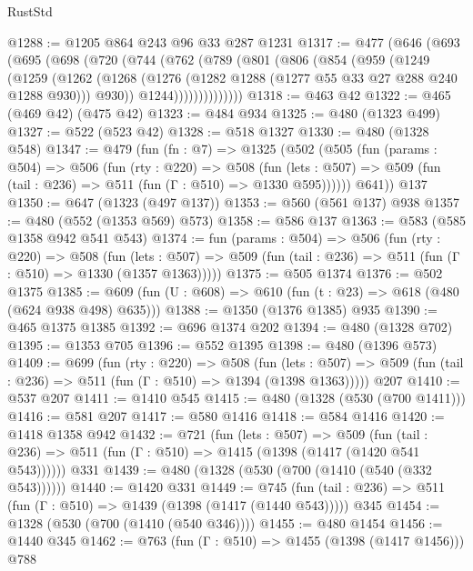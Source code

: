 \begin{lexlean}{RustStd}
\begin{coremodule}
{\begin{coremodule}
{{{{{{{{{@1288 := @1205 @864 @243 @96 @33 @287 @1231
@1317 := @477
    (@646
      (@693
        (@695
          (@698
            (@720
              (@744
                (@762
                  (@789
                    (@801
                      (@806
                        (@854
                          (@959
                            (@1249
                              (@1259
                                (@1262
                                  (@1268
                                    (@1276 (@1282 @1288 (@1277 @55 @33 @27 @288 @240 @1288 @930)))
                                    @930))
                                @1244))))))))))))))
@1318 := @463 @42
@1322 := @465 (@469 @42) (@475 @42)
@1323 := @484 @934
@1325 := @480 (@1323 @499)
@1327 := @522 (@523 @42)
@1328 := @518 @1327
@1330 := @480 (@1328 @548)
@1347 := @479
    (fun (fn : @7) =>
    @1325
      (@502
        (@505
          (fun (params : @504) =>
          @506
            (fun (rty : @220) =>
            @508
              (fun (lets : @507) =>
              @509 (fun (tail : @236) => @511 (fun (Γ : @510) => @1330 @595))))))
        @641))
    @137
@1350 := @647 (@1323 (@497 @137))
@1353 := @560 (@561 @137) @938
@1357 := @480 (@552 (@1353 @569) @573)
@1358 := @586 @137
@1363 := @583 (@585 @1358 @942 @541 @543)
@1374 := fun (params : @504) =>
  @506
    (fun (rty : @220) =>
    @508
      (fun (lets : @507) =>
      @509 (fun (tail : @236) => @511 (fun (Γ : @510) => @1330 (@1357 @1363)))))
@1375 := @505 @1374
@1376 := @502 @1375
@1385 := @609 (fun (U : @608) => @610 (fun (t : @23) => @618 (@480 (@624 @938 @498) @635)))
@1388 := @1350 (@1376 @1385) @935
@1390 := @465 @1375 @1385
@1392 := @696 @1374 @202
@1394 := @480 (@1328 @702)
@1395 := @1353 @705
@1396 := @552 @1395
@1398 := @480 (@1396 @573)
@1409 := @699
    (fun (rty : @220) =>
    @508
      (fun (lets : @507) =>
      @509 (fun (tail : @236) => @511 (fun (Γ : @510) => @1394 (@1398 @1363)))))
    @207
@1410 := @537 @207
@1411 := @1410 @545
@1415 := @480 (@1328 (@530 (@700 @1411)))
@1416 := @581 @207
@1417 := @580 @1416
@1418 := @584 @1416
@1420 := @1418 @1358 @942
@1432 := @721
    (fun (lets : @507) =>
    @509 (fun (tail : @236) => @511 (fun (Γ : @510) => @1415 (@1398 (@1417 (@1420 @541 @543))))))
    @331
@1439 := @480 (@1328 (@530 (@700 (@1410 (@540 (@332 @543))))))
@1440 := @1420 @331
@1449 := @745
    (fun (tail : @236) => @511 (fun (Γ : @510) => @1439 (@1398 (@1417 (@1440 @543)))))
    @345
@1454 := @1328 (@530 (@700 (@1410 (@540 @346))))
@1455 := @480 @1454
@1456 := @1440 @345
@1462 := @763 (fun (Γ : @510) => @1455 (@1398 (@1417 @1456))) @788
}}}}}}}}}
\end{coremodule}}
\end{coremodule}
\end{lexlean}
